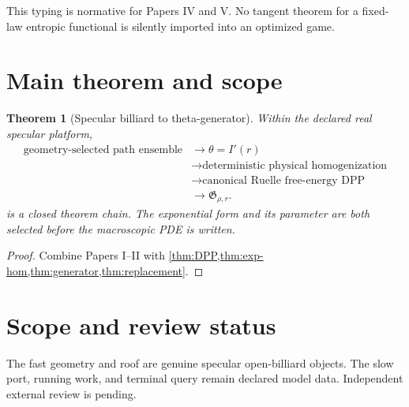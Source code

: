 \documentclass[11pt,reqno]{amsart}
\newtheorem{theorem}{Theorem}[section]
\theoremstyle{definition}
\theoremstyle{remark}
\begin{document}
This typing is normative for Papers IV and V.  No tangent theorem for a
fixed-law entropic functional is silently imported into an optimized game.

\section{Main theorem and scope}\label{sec:main}
\begin{theorem}[Specular billiard to theta-generator]\label{thm:main}
Within the declared real specular platform,
\[
\begin{aligned}
 \text{geometry-selected path ensemble}
 &\longrightarrow \theta=I'(r)\\
 &\longrightarrow \text{deterministic physical homogenization}\\
 &\longrightarrow \text{canonical Ruelle free-energy DPP}\\
 &\longrightarrow \mathfrak G_{\rho,r}.
\end{aligned}
\]
is a closed theorem chain.  The exponential form and its parameter are both
selected before the macroscopic PDE is written.
\end{theorem}
\begin{proof}
Combine Papers I--II with
\cref{thm:DPP,thm:exp-hom,thm:generator,thm:replacement}.
\end{proof}

\section*{Scope and review status}
The fast geometry and roof are genuine specular open-billiard objects.  The
slow port, running work, and terminal query remain declared model data.
Independent external review is pending.

\nocite{*}


\end{document}
